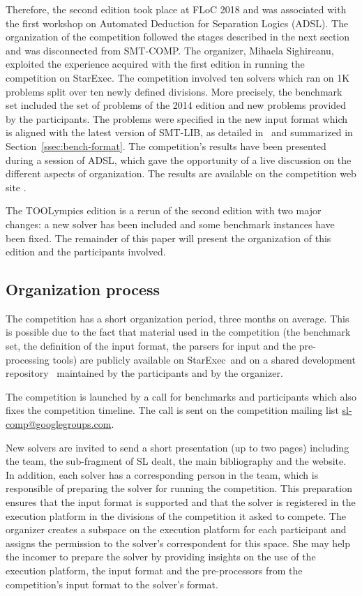 \documentclass[orivec]{llncs}
\newcommand{\smtlib}{\textsf{SMT-LIB}}
\newcommand{\smtcomp}{\textsf{SMT-COMP}}
\newcommand{\starexec}{\textsf{StarExec}}
\begin{document}
Therefore, the second edition took place at FLoC 2018 and was associated
with the first workshop on Automated Deduction for Separation Logics (ADSL).
The organization of the competition followed the stages described in the next section
and was disconnected from \smtcomp. The organizer, Mihaela Sighireanu,
exploited the experience acquired with the first edition in running the
competition on \starexec.
The competition involved ten solvers which ran on 1K problems split over ten 
newly defined divisions.
More precisely, the benchmark set included the set of problems of the 2014 edition 
and new problems provided by the participants.
The problems were specified in the new input format which is aligned with
the latest version of \smtlib, as detailed in~\cite{IosifSRS18} and 
summarized in Section~\ref{ssec:bench-format}. 
The competition's results have been presented during a session of ADSL,
which gave the opportunity of a live discussion on the different aspects of
organization. The results are available on the
competition web site \cite{SLCOMP18site}.

The TOOLympics edition is a rerun of the
second edition with two major changes:
a new solver has been included and
some benchmark instances have been fixed.
The remainder of this paper will present the organization
of this edition and the participants involved.  

\subsection{Organization process}

The competition has a short organization period,
three months on average. This is possible due to the fact that 
material used in the competition (the benchmark set, the definition of
the input format, the parsers for input and the pre-processing tools)
are publicly available on \starexec\ and on a shared development repository~\cite{SLCOMPgit} maintained by the participants 
and by the organizer.

The competition is launched by a call for benchmarks and participants
which also fixes the competition timeline. The call is sent
on the competition mailing list \url{sl-comp@googlegroups.com}.

New solvers are invited to send a short presentation (up to two pages) 
including the team, the sub-fragment of SL dealt, the main bibliography and the website.
In addition, each solver has a corresponding person in the team,
which is responsible of preparing the solver for running the
competition. This preparation ensures that the input format
is supported and that the solver is registered in the execution
platform in the divisions of the competition it asked to compete.
The organizer creates a subspace on the execution platform for
each participant and assigns the permission to the solver's correspondent  
for this space. She may help the incomer to prepare the solver by providing
insights on the use of the execution platform,
the input format and the pre-processors from the competition's input 
format to the solver's format.
\end{document}
